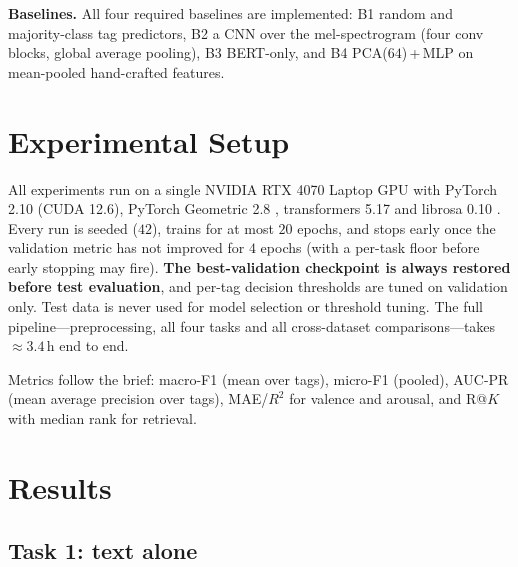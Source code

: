 \documentclass{article}
\begin{document}
\textbf{Baselines.} All four required baselines are implemented: B1 random and
majority-class tag predictors, B2 a CNN over the mel-spectrogram (four conv blocks,
global average pooling), B3 BERT-only, and B4 PCA($64$)\,+\,MLP on mean-pooled
hand-crafted features.

\section{Experimental Setup}

All experiments run on a single NVIDIA RTX 4070 Laptop GPU with PyTorch 2.10
(CUDA 12.6), PyTorch Geometric 2.8 \citep{fey2019pyg}, transformers 5.17 and
librosa 0.10 \citep{mcfee2015librosa}. Every run is seeded ($42$), trains for at
most $20$ epochs, and stops early once the validation metric has not improved for
$4$ epochs (with a per-task floor before early stopping may fire). \textbf{The
best-validation checkpoint is always restored before test evaluation}, and per-tag
decision thresholds are tuned on validation only. Test data is never used for
model selection or threshold tuning. The full pipeline---preprocessing, all four
tasks and all cross-dataset comparisons---takes $\approx 3.4$\,h end to end.

Metrics follow the brief: macro-F1 (mean over tags), micro-F1 (pooled), AUC-PR
(mean average precision over tags), MAE/$R^2$ for valence and arousal, and
R@$K$ with median rank for retrieval.

\section{Results}

\subsection{Task 1: text alone}
\end{document}

